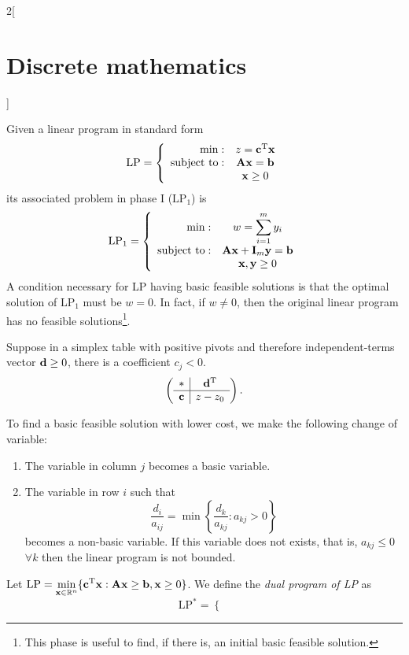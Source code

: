 \documentclass[../../../main.tex]{subfiles}
\begin{document}
\begin{multicols}{2}[\section{Discrete mathematics}]
\begin{theorem}
\end{theorem}
\begin{definition}
Given a linear program in standard form $$\text{LP}=\left\{\begin{array}{rc}
    \min: & z=\transpose{c}\mathblack{x} \\
    \text{subject to}: & \mathblack{A}\mathblack{x}=\mathblack{b}\\
     & \mathblack{x}\geq 0
    \end{array}\right.$$ its associated problem in phase I ($\text{LP}_1$) is $$\text{LP}_1=\left\{\begin{array}{rc}
    \min: & \displaystyle w=\sum_{i=1}^my_i \\
    \text{subject to}: & \mathblack{A}\mathblack{x}+\mathblack{I}_m\mathblack{y}=\mathblack{b}\\
     & \mathblack{x},\mathblack{y}\geq 0
    \end{array}\right.$$
    A condition necessary for LP having basic feasible solutions is that the optimal solution of $\text{LP}_1$ must be $w=0$. In fact, if $w\ne 0$, then the original linear program has no feasible solutions\footnote{This phase is useful to find, if there is, an initial basic feasible solution.}.
\end{definition}
\begin{prop}
Suppose in a simplex table with positive pivots and therefore independent-terms vector $\mathblack{d}\geq 0$, there is a coefficient $c_j<0$. $$\left(\begin{array}{c|c}
    * & \transpose{d}\\
    \hline
    \mathblack{c} & z-z_0
\end{array}\right).$$
\end{prop}
To find a basic feasible solution with lower cost, we make the following change of variable:
\begin{enumerate}
    \item The variable in column $j$ becomes a basic variable.
    \item The variable in row $i$ such that $$\frac{d_i}{a_{ij}}=\min\left\{\frac{d_k}{a_{kj}}:a_{kj}>0\right\}$$ becomes a non-basic variable. If this variable does not exists, that is, $a_{kj}\leq0$ $\forall k$ then the linear program is not bounded.
\end{enumerate}
\begin{definition}
Let $\text{LP}=\displaystyle\min_{\mathblack{x}\in\RR ^n}\{\transpose{c}\mathblack{x}:\mathblack{A}\mathblack{x}\geq \mathblack{b},\mathblack{x}\geq 0\}$. We define the \textit{dual program of LP} as $$\text{LP}^*=\left\{\begin{array}{rc}

\end{array}$$
\end{definition}
\end{multicols}
\end{document}

